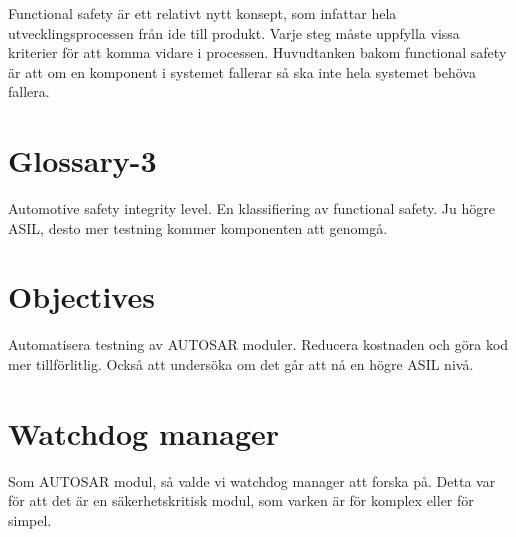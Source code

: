 \documentclass[a4paper]{article}
\begin{document}
Functional safety är ett relativt nytt konsept, som infattar hela
utvecklingsprocessen från ide till produkt. Varje steg måste uppfylla
vissa kriterier för att komma vidare i processen.
Huvudtanken bakom functional safety är att om en komponent i systemet
fallerar så ska inte hela systemet behöva fallera.






\section{Glossary-3}
Automotive safety integrity level. En klassifiering av functional safety.
Ju högre ASIL, desto mer testning kommer komponenten att genomgå.


\section{Objectives}
Automatisera testning av AUTOSAR moduler. Reducera kostnaden och göra
kod mer tillförlitlig. Också att undersöka om det går att nå en högre
ASIL nivå.



\section{Watchdog manager}
Som AUTOSAR modul, så valde vi watchdog manager att forska på.
Detta var för att det är en säkerhetskritisk modul, som varken är för
komplex eller för simpel.

\end{document}
